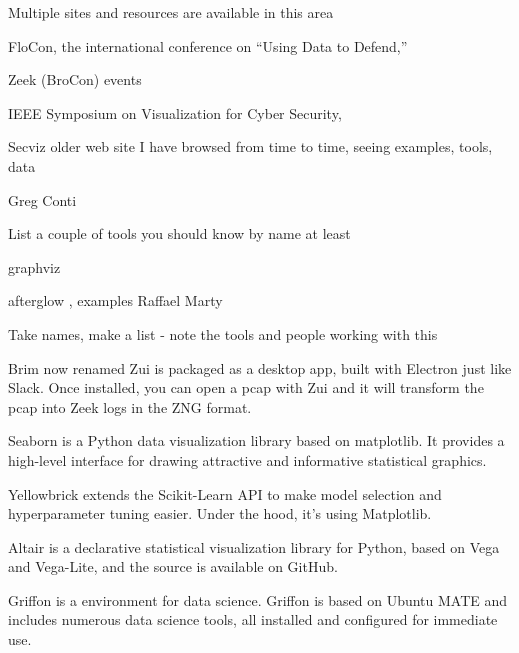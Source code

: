 \documentclass[Screen16to9,17pt]{foils}
\begin{document}


\begin{quote}

\end{quote}

\begin{list2}
  \item Multiple sites and resources are available in this area
  \item FloCon, the international conference on “Using Data to Defend,” 
  \item Zeek (BroCon) events 
  \item IEEE Symposium on Visualization for Cyber Security, 
  \item Secviz older web site I have browsed from time to time, seeing examples, tools, data
  \item Greg Conti 
\item List a couple of tools you should know by name at least
\item graphviz 
\item afterglow , examples Raffael Marty
\end{list2}

\centerline{Take names, make a list - note the tools and people working with this}



\begin{list2}
  \item {} Brim now renamed Zui is packaged as a desktop app, built with Electron just like Slack. Once installed, you can open a pcap with Zui and it will transform the pcap into Zeek logs in the ZNG format.
  \item {} Seaborn is a Python data visualization library based on matplotlib. It provides a high-level interface for drawing attractive and informative statistical graphics.
  \item {}  Yellowbrick extends the Scikit-Learn API to make model selection and hyperparameter tuning easier. Under the hood, it’s using Matplotlib.
  \item {} Altair is a declarative statistical visualization library for Python, based on Vega and Vega-Lite, and the source is available on GitHub.
  \item {} Griffon is a environment for data science. Griffon is based on Ubuntu MATE and includes numerous data science tools, all installed and configured for immediate use.
\end{list2}
\end{document}
